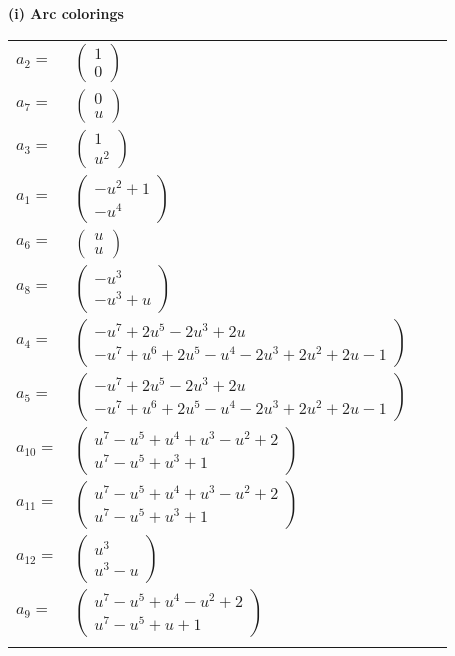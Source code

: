 \documentclass[1p]{elsarticle_modified}
\theoremstyle{definition}
\begin{document}
\flushleft \textbf{(i) Arc colorings}\\
\begin{tabular}{m{7pt} m{180pt} m{7pt} m{180pt} }
\flushright $a_{2}=$&$\begin{pmatrix}1\\0\end{pmatrix}$ \\
\flushright $a_{7}=$&$\begin{pmatrix}0\\u\end{pmatrix}$ \\
\flushright $a_{3}=$&$\begin{pmatrix}1\\u^2\end{pmatrix}$ \\
\flushright $a_{1}=$&$\begin{pmatrix}- u^2+1\\- u^4\end{pmatrix}$ \\
\flushright $a_{6}=$&$\begin{pmatrix}u\\u\end{pmatrix}$ \\
\flushright $a_{8}=$&$\begin{pmatrix}- u^3\\- u^3+u\end{pmatrix}$ \\
\flushright $a_{4}=$&$\begin{pmatrix}- u^7+2 u^5-2 u^3+2 u\\- u^7+u^6+2 u^5- u^4-2 u^3+2 u^2+2 u-1\end{pmatrix}$ \\
\flushright $a_{5}=$&$\begin{pmatrix}- u^7+2 u^5-2 u^3+2 u\\- u^7+u^6+2 u^5- u^4-2 u^3+2 u^2+2 u-1\end{pmatrix}$ \\
\flushright $a_{10}=$&$\begin{pmatrix}u^7- u^5+u^4+u^3- u^2+2\\u^7- u^5+u^3+1\end{pmatrix}$ \\
\flushright $a_{11}=$&$\begin{pmatrix}u^7- u^5+u^4+u^3- u^2+2\\u^7- u^5+u^3+1\end{pmatrix}$ \\
\flushright $a_{12}=$&$\begin{pmatrix}u^3\\u^3- u\end{pmatrix}$ \\
\flushright $a_{9}=$&$\begin{pmatrix}u^7- u^5+u^4- u^2+2\\u^7- u^5+u+1\end{pmatrix}$\\&\end{tabular}
\end{document}
